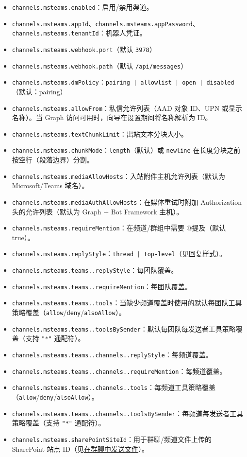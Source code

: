 \begin{itemize}
  \item \texttt{channels.msteams.enabled}：启用/禁用渠道。
  \item \texttt{channels.msteams.appId}、\texttt{channels.msteams.appPassword}、\texttt{channels.msteams.tenantId}：机器人凭证。
  \item \texttt{channels.msteams.webhook.port}（默认 \texttt{3978}）
  \item \texttt{channels.msteams.webhook.path}（默认 \texttt{/api/messages}）
  \item \texttt{channels.msteams.dmPolicy}：\texttt{pairing | allowlist | open | disabled}（默认：pairing）
  \item \texttt{channels.msteams.allowFrom}：私信允许列表（AAD 对象 ID、UPN 或显示名称）。当 Graph 访问可用时，向导在设置期间将名称解析为 ID。
  \item \texttt{channels.msteams.textChunkLimit}：出站文本分块大小。
  \item \texttt{channels.msteams.chunkMode}：\texttt{length}（默认）或 \texttt{newline} 在长度分块之前按空行（段落边界）分割。
  \item \texttt{channels.msteams.mediaAllowHosts}：入站附件主机允许列表（默认为 Microsoft/Teams 域名）。
  \item \texttt{channels.msteams.mediaAuthAllowHosts}：在媒体重试时附加 Authorization 头的允许列表（默认为 Graph + Bot Framework 主机）。
  \item \texttt{channels.msteams.requireMention}：在频道/群组中需要 @提及（默认 true）。
  \item \texttt{channels.msteams.replyStyle}：\texttt{thread | top-level}（见\href{\#reply-style-threads-vs-posts}{回复样式}）。
  \item \texttt{channels.msteams.teams..replyStyle}：每团队覆盖。
  \item \texttt{channels.msteams.teams..requireMention}：每团队覆盖。
  \item \texttt{channels.msteams.teams..tools}：当缺少频道覆盖时使用的默认每团队工具策略覆盖（\texttt{allow}/\texttt{deny}/\texttt{alsoAllow}）。
  \item \texttt{channels.msteams.teams..toolsBySender}：默认每团队每发送者工具策略覆盖（支持 \texttt{"*"} 通配符）。
  \item \texttt{channels.msteams.teams..channels..replyStyle}：每频道覆盖。
  \item \texttt{channels.msteams.teams..channels..requireMention}：每频道覆盖。
  \item \texttt{channels.msteams.teams..channels..tools}：每频道工具策略覆盖（\texttt{allow}/\texttt{deny}/\texttt{alsoAllow}）。
  \item \texttt{channels.msteams.teams..channels..toolsBySender}：每频道每发送者工具策略覆盖（支持 \texttt{"*"} 通配符）。
  \item \texttt{channels.msteams.sharePointSiteId}：用于群聊/频道文件上传的 SharePoint 站点 ID（见\href{\#sending-files-in-group-chats}{在群聊中发送文件}）。
\end{itemize}


